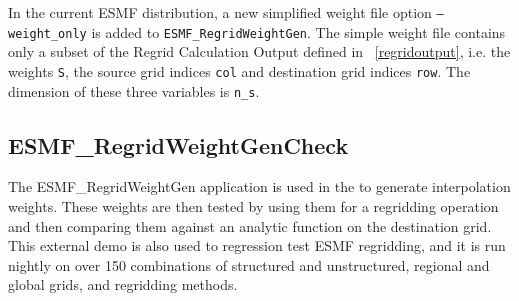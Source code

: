 In the current ESMF distribution, a new simplified weight file option {\tt --weight\_only} is added to {\tt ESMF\_RegridWeightGen}.  
The simple weight file contains only a subset of the Regrid Calculation Output defined in ~\ref{regridoutput}, i.e. 
the weights {\tt S}, the source grid indices {\tt col} and destination grid indices {\tt row}.  The dimension of these three variables is {\tt n\_s}.

\subsection{ESMF\_RegridWeightGenCheck}\label{sec:regridweightgencheck}

The ESMF\_RegridWeightGen application is used in the
 to generate interpolation weights.  These weights are then tested by using them for a regridding operation and then comparing them against an analytic function on the destination grid.  This external demo is also used to regression test ESMF regridding, and it is run nightly on over 150 combinations of structured and unstructured, regional and global grids, and regridding methods.
